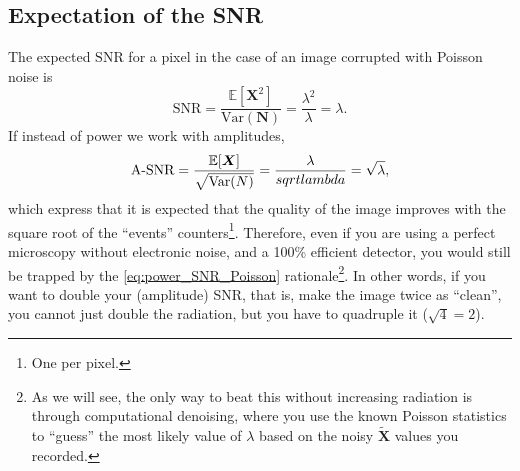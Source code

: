 \subsection{Expectation of the \gls{SNR}}
The expected $\text{SNR}$ for a
pixel in the case of an image corrupted with Poisson noise is
\begin{equation}
  \text{SNR} = \frac{\mathbb{E}[\bm{X}^2]}{\text{Var}(\bm{N})} = \frac{\lambda^2}{\lambda} = \lambda.
  \label{eq:power_SNR_Poisson}
\end{equation}
If instead of power we work with amplitudes,
\begin{equation}
  \text{A-SNR} = \frac{\mathbb{E}[\bm{X}]}{\sqrt{\text{Var}(N)}} = \frac{\lambda}{\\sqrt{lambda}} = \sqrt{\lambda},
  \label{eq:power_SNR_Poisson}
\end{equation}
which express that it is expected that the quality of the image
improves with the square root of the ``events'' counters\footnote{One
  per pixel.}. Therefore, even if you are using a perfect microscopy
without electronic noise, and a 100\% efficient detector, you would
still be trapped by the \ref{eq:power_SNR_Poisson}
rationale\footnote{As we will see, the only way to beat this without
  increasing radiation is through computational denoising, where you
  use the known Poisson statistics to ``guess'' the most likely value of
  $\lambda$ based on the noisy $\tilde{\bm{X}}$ values you recorded.}. In other words, if you want to double your (amplitude) \gls{SNR}, that is, make the image twice as ``clean'', you cannot just double the radiation, but you have to quadruple it ($\sqrt{4}=2$).


